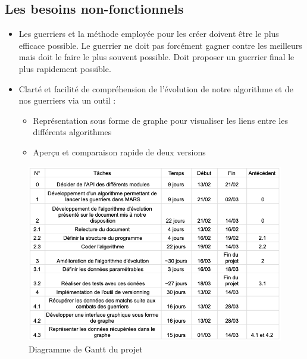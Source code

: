 \documentclass{article}
\begin{document}
    \subsection{Les besoins non-fonctionnels}
        \begin{itemize}
            \item Les guerriers et la méthode employée pour les créer doivent être le plus efficace possible. Le guerrier ne doit pas forcément gagner contre les meilleurs mais doit le faire le plus souvent possible. Doit proposer un guerrier final le plus rapidement possible.
            \item Clarté et facilité de compréhension de l’évolution de notre algorithme et de nos guerriers via un outil : 
            \begin{itemize}
                \item Représentation sous forme de graphe pour visualiser les liens entre les différents algorithmes 
                \item Aperçu et comparaison rapide de deux versions
            \end{itemize}
        \end{itemize}
            \begin{figure}
                \centerline{\includegraphics[scale=0.7]{Images/Gantt.png}}
                \caption{Diagramme de Gantt du projet} 
            \end{figure}
\end{document}
